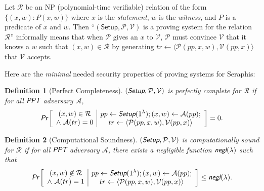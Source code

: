 \documentclass{article}
\theoremstyle{plain}
\newtheorem{definition}{Definition}[section]
\theoremstyle{remark}
\begin{document}
Let $\mathcal{R}$ be an NP (polynomial-time verifiable) relation of the form $\{(x,w):P(x, w)\}$ where $x$ is the \textit{statement}, $w$ is the \textit{witness}, and $P$ is a predicate of $x$ and $w$. Then ``$(\textsf{Setup}, \mathcal{P}, \mathcal{V})$ is a proving system for the relation $\mathcal{R}$'' informally means that when $\mathcal{P}$ gives an $x$ to $\mathcal{V}$, $\mathcal{P}$ must convince $\mathcal{V}$ that it knows a $w$ such that $(x,w)\in\mathcal{R}$ by generating $tr\leftarrow\langle\mathcal{P}(pp, x, w), \mathcal{V}(pp, x)\rangle$ that $\mathcal{V}$ accepts.

Here are the \textit{minimal} needed security properties of proving systems for Seraphis:

\begin{definition}[Perfect Completeness]
$(\emph{\textsf{Setup}}, \mathcal{P}, \mathcal{V})$ is perfectly complete for $\mathcal{R}$ if for all $\emph{\textsf{PPT}}$ adversary $\mathcal{A}$,
\begin{align*}
\emph{\textsf{Pr}}\left[
\begin{array}{c|c}
    \begin{gathered}
        (x,w)\in\mathcal{R}\\
        \wedge\ \mathcal{A}(tr) = 0
    \end{gathered}
    &
    \begin{gathered}
        pp\leftarrow\emph{\textsf{Setup}}(1^{\lambda}); (x, w)\leftarrow\mathcal{A}(pp); \\
        tr\leftarrow\langle\mathcal{P}(pp,x,w), \mathcal{V}(pp,x)\rangle
    \end{gathered}
\end{array}
\right]
= 0.
\end{align*}
\end{definition}

\begin{definition}[Computational Soundness]
$(\emph{\textsf{Setup}}, \mathcal{P}, \mathcal{V})$ is computationally sound for $\mathcal{R}$ if for all $\emph{\textsf{PPT}}$ adversary $\mathcal{A}$, there exists a negligible function $\emph{\textsf{negl}}(\lambda)$ such that
\begin{align*}
\emph{\textsf{Pr}}\left[
\begin{array}{c|c}
    \begin{gathered}
        (x,w)\not\in\mathcal{R}\\
        \wedge\ \mathcal{A}(tr) = 1
    \end{gathered}
    &
    \begin{gathered}
        pp\leftarrow\emph{\textsf{Setup}}(1^{\lambda}); (x, w)\leftarrow\mathcal{A}(pp); \\
        tr\leftarrow\langle\mathcal{P}(pp,x,w), \mathcal{V}(pp,x)\rangle
    \end{gathered}
\end{array}
\right]
\le \emph{\textsf{negl}}(\lambda).
\end{align*}
\end{definition}
\end{document}
